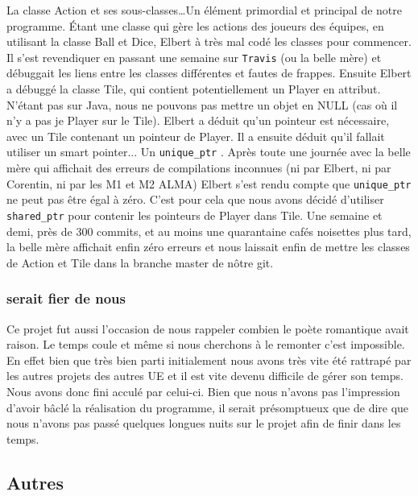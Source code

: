 \documentclass{article}
\newcommand{\info}{\texttt}
\begin{document}
        La classe Action et ses sous-classes\dots Un élément primordial et principal de notre programme. Étant une classe qui gère les actions des joueurs des équipes, en utilisant la classe Ball et Dice, Elbert à très mal codé les classes pour commencer. Il s'est revendiquer en passant une semaine sur \info{Travis} (ou la belle mère) et débuggait les liens entre les classes différentes et fautes de frappes. Ensuite Elbert a débuggé la classe Tile, qui contient potentiellement un Player en attribut. N'étant pas sur Java, nous ne pouvons pas mettre un objet en NULL (cas où il n'y a pas je Player sur le Tile). Elbert a déduit qu'un pointeur est nécessaire, avec un Tile contenant un pointeur de Player. Il a ensuite déduit qu'il fallait utiliser un smart pointer... Un \info{unique\_ptr} . Après toute une journée avec la belle mère qui affichait des erreurs de compilations inconnues (ni par Elbert, ni par Corentin, ni par les M1 et M2 ALMA) Elbert s'est rendu compte que \info{unique\_ptr} ne peut pas être égal à zéro. C'est pour cela que nous avons décidé d'utiliser \info{shared\_ptr} pour contenir les pointeurs de Player dans Tile. Une semaine et demi, près de 300 commits, et au moins une quarantaine cafés noisettes plus tard, la belle mère affichait enfin zéro erreurs et nous laissait enfin de mettre les classes de Action et Tile dans la branche master de nôtre git.
        
        \subsubsection{ serait fier de nous}
        
        Ce projet fut aussi l'occasion de nous rappeler combien le poète romantique avait raison. Le temps coule et même si nous cherchons à le remonter c'est impossible. En effet bien que très bien parti initialement nous avons très vite été rattrapé par les autres projets des autres UE et il est vite devenu difficile de gérer son temps. Nous avons donc fini acculé par celui-ci. Bien que nous n'avons pas l'impression d'avoir bâclé la réalisation du programme, il serait présomptueux que de dire que nous n'avons pas passé quelques longues nuits sur le projet afin de finir dans les temps. 
    
    \subsection{Autres}
\end{document}
